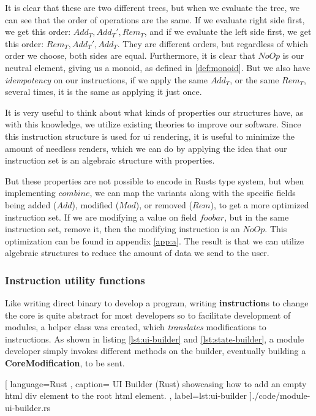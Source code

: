 It is clear that these are two different trees, but when we evaluate the tree,
we can see that the order of operations are the same. If we evaluate right side
first, we get this order: $Add_T, Add_T', Rem_T$, and if we evaluate the left
side first, we get this order: $Rem_T, Add_T', Add_T$. They are different
orders, but regardless of which order we choose, both sides are equal.
Furthermore, it is clear that $NoOp$ is our neutral element, giving us a monoid,
as defined in \ref{def:monoid}. But we also have \textit{idempotency} on our
instructions, if we apply the same $Add_T$, or the same $Rem_T$, several times,
it is the same as applying it just once.

It is very useful to think about what kinds of properties our structures have,
as with this knowledge, we utilize existing theories to improve our software.
Since this instruction structure is used for \gls*{ui} rendering, it is useful
to minimize the amount of needless renders, which we can do by applying the idea
that our instruction set is an algebraic structure with properties.

But these properties are not possible to encode in Rusts type system, but when
implementing $combine$, we can map the variants along with the specific fields
being added ($Add$), modified ($Mod$), or removed ($Rem$), to get a more
optimized instruction set. If we are modifying a value on field $foobar$, but in
the same instruction set, remove it, then the modifying instruction is an
$NoOp$. This optimization can be found in appendix \ref{app:a}. The result is
that we can utilize algebraic structures to reduce the amount of data we send
to the user.


\subsubsection{Instruction utility functions}

Like writing direct binary to develop a program, writing \textbf{instruction}s to
change the core is quite abstract for most developers so to facilitate development
of modules, a helper class was created, which \textit{translates} modifications
to instructions. As shown in listing \ref{lst:ui-builder} and
\ref{lst:state-builder}, a module developer simply invokes different methods on
the builder, eventually building a \textbf{CoreModification}, to be sent.

\begin{center}
  
   [ language=Rust
   , caption={
     UI Builder (Rust) showcasing how to add an empty \gls*{html} div element to
     the root \gls*{html} element.
   }
   , label=lst:ui-builder
   ]{./code/module-ui-builder.rs}
\end{center}

